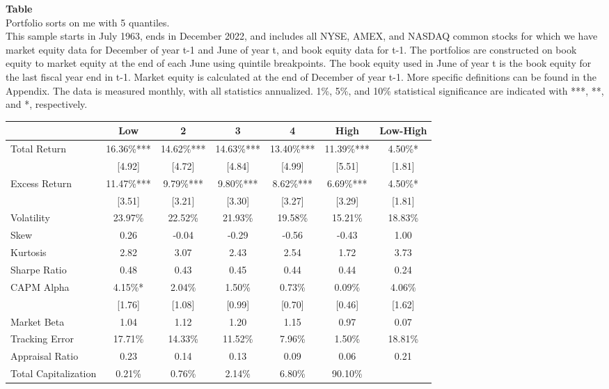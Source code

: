 \begin{table*}[ht!]
\raggedright
{}
\label{tab: quantile_sortme_with_5_quantiles}
\textbf{Table \thetable} \\
Portfolio sorts on me with 5 quantiles. \\
\hspace*{1em}This sample starts in July 1963, ends in December 2022, and includes all NYSE, AMEX, and NASDAQ common stocks for which we have market equity data for December of year t-1 and June of year t, and book equity data for t-1. The portfolios are constructed on book equity to market equity at the end of each June using quintile breakpoints.  The book equity used in June of year t is the book equity for the last fiscal year end in t-1.  Market equity is calculated at the end of December of year t-1.  More specific definitions can be found in the Appendix.  The data is measured monthly, with all statistics annualized.  1\%, 5\%, and 10\% statistical significance are indicated with ***, **, and *, respectively. \\
\vspace{0.5em}
\centering
\begin{adjustbox}{max width=\textwidth}
\begin{tabular}{@{}lcccccc@{}}
\toprule
 & Low & 2 & 3 & 4 & High & Low-High \\
\midrule
Total Return & 16.36\%*** & 14.62\%*** & 14.63\%*** & 13.40\%*** & 11.39\%*** & 4.50\%* \\
 & [4.92] & [4.72] & [4.84] & [4.99] & [5.51] & [1.81] \\
Excess Return & 11.47\%*** & 9.79\%*** & 9.80\%*** & 8.62\%*** & 6.69\%*** & 4.50\%* \\
 & [3.51] & [3.21] & [3.30] & [3.27] & [3.29] & [1.81] \\
Volatility & 23.97\% & 22.52\% & 21.93\% & 19.58\% & 15.21\% & 18.83\% \\
Skew & 0.26 & -0.04 & -0.29 & -0.56 & -0.43 & 1.00 \\
Kurtosis & 2.82 & 3.07 & 2.43 & 2.54 & 1.72 & 3.73 \\
Sharpe Ratio & 0.48 & 0.43 & 0.45 & 0.44 & 0.44 & 0.24 \\
CAPM Alpha & 4.15\%* & 2.04\% & 1.50\% & 0.73\% & 0.09\% & 4.06\% \\
 & [1.76] & [1.08] & [0.99] & [0.70] & [0.46] & [1.62] \\
Market Beta & 1.04 & 1.12 & 1.20 & 1.15 & 0.97 & 0.07 \\
Tracking Error & 17.71\% & 14.33\% & 11.52\% & 7.96\% & 1.50\% & 18.81\% \\
Appraisal Ratio & 0.23 & 0.14 & 0.13 & 0.09 & 0.06 & 0.21 \\
Total Capitalization & 0.21\% & 0.76\% & 2.14\% & 6.80\% & 90.10\% &  \\
\bottomrule
\end{tabular}
\end{adjustbox}
\end{table*}